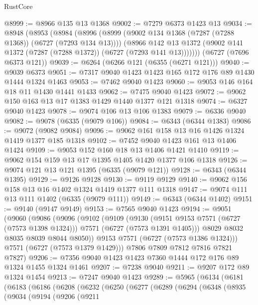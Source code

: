 \begin{lexlean}{RustCore}
\begin{coremodule}
@8999 := @8966 @135 @13 @1368
@9002 := @7279 @6373 @1423 @13
@9034 := @8948
    (@8953
      (@8984
        (@8996
          (@8999 (@9002 @134 @1368 (@7287 (@7288 @1368)) (@6727 (@7293 @134 @13))))
          (@8966
            @142
            @13
            @1372
            (@9002 @141 @1372 (@7287 (@7288 @1372)) (@6727 (@7293 @141 @13)))))))
    (@6727 (@7696 @6373 @121))
@9039 := @6264 (@6266 @121 (@6355 (@6271 @121)))
@9040 := @9039 @6373
@9051 := @7317 @9040 @1423 @1423 @165 @172 @176 @89 @1430 @1444 @1324 @1463
@9053 := @7462 @9040 @1423
@9060 := @9053 @146 @164 @18 @11 @1430 @1441 @1433
@9062 := @7475 @9040 @1423
@9072 := @9062 @150 @163 @13 @17 @1383 @1429 @1440 @1377 @121 @1318
@9074 := @6327 @9040 @1423
@9078 := @9074 @106 @13 @106 @1383
@9079 := @6336 @9040
@9082 := @9078 (@6335 (@9079 @106))
@9084 := @6343 (@6344 @1383)
@9086 := @9072 (@9082 @9084)
@9096 := @9062 @161 @158 @13 @16 @1426 @1324 @1419 @1377 @185 @1318
@9102 := @7452 @9040 @1423 @161 @13 @1406 @1424
@9109 := @9053 @152 @160 @18 @13 @1406 @1421 @1410
@9119 := @9062 @154 @159 @13 @17 @1395 @1405 @1420 @1377 @106 @1318
@9126 := @9074 @121 @13 @121 @1395 (@6335 (@9079 @121))
@9128 := @6343 (@6344 @1395)
@9129 := @9126 @9128
@9130 := @9119 @9129
@9140 := @9062 @156 @158 @13 @16 @1402 @1324 @1419 @1377 @111 @1318
@9147 := @9074 @111 @13 @111 @1402 (@6335 (@9079 @111))
@9149 := @6343 (@6344 @1402)
@9151 := @9140 (@9147 @9149)
@9153 := @7565 @9040 @1423
@9194 := @9051
    (@9060
      (@9086
        (@9096
          (@9102
            (@9109
              (@9130
                (@9151 @9153 @7571 (@6727 (@7573 @1398 @1324)))
                @7571
                (@6727 (@7573 @1391 @1405)))
              @8029
              @8032
              @8035
              @8039
              @8044
              @8050))
          @9153
          @7571
          (@6727 (@7573 @1386 @1324)))
        @7571
        (@6727 (@7573 @1379 @1429)))
      @7806
      @7809
      @7812
      @7816
      @7821
      @7827)
@9206 := @7356 @9040 @1423 @1423 @7360 @1444 @172 @176 @89 @1324 @1455 @1324 @1461
@9207 := @7238 @9040
@9211 := @9207 @172 @89 @1324 @1454
@9213 := @7247 @9040 @1423
@9289 := @5965
    (@6134
      (@6181
        (@6183
          (@6186
            (@6208
              (@6232
                (@6250
                  (@6277
                    (@6289
                      (@6294
                        (@6348
                          (@8935
                            (@9034
                              (@9194
                                (@9206
                                  (@9211

\end{coremodule}
\end{lexlean}
